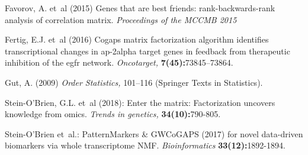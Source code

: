 \documentclass[12pt]{article}
\begin{document}
\vspace{2mm}

\begingroup
\renewcommand{\section}[2]{}%
\begin{thebibliography}{}
\providecommand{\url}[1]{\texttt{#1}}
\providecommand{\urlprefix}{URL }

Favorov, A. et~al (2015) Genes that are best friends: rank-backwards-rank 
	analysis of correlation matrix. \textit{Proceedings of the MCCMB 2015}

Fertig, E.J. et~al (2016) Cogaps
  matrix factorization algorithm identifies transcriptional changes in
  ap-2alpha target genes in feedback from therapeutic inhibition of the egfr
  network. \textit{Oncotarget, }\textbf{7(45):}73845–73864. 

Gut, A. (2009) \textit{Order Statistics, } 101–116 (Springer Texts in Statistics). 

Stein-O’Brien, G.L. et~al (2018): Enter the
  matrix: Factorization uncovers knowledge from omics. \textit{Trends in genetics, } \textbf{34(10):}790-805.

Stein-O’Brien et~al.:
  PatternMarkers \& GWCoGAPS (2017) for novel data-driven biomarkers via whole
  transcriptome NMF. \textit{Bioinformatics} \textbf{33(12):}1892-1894.
\end{thebibliography}
\endgroup


\end{document}
